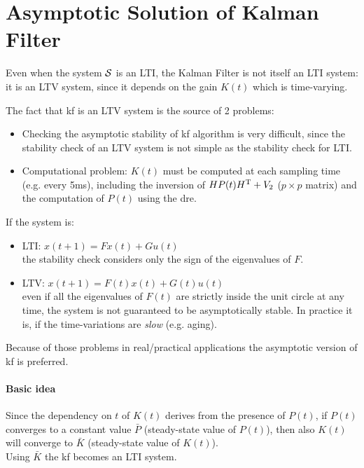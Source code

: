 \section{Asymptotic Solution of Kalman Filter}

\begin{obs} 
    Even when the system $\mathcal{S}$ is an LTI, the Kalman Filter is not itself an LTI system: it is an LTV system, since it depends on the gain $K(t)$ which is time-varying.
\end{obs}


The fact that \gls{kf} is an LTV system is the source of 2 problems:
\begin{itemize}
    \item Checking the asymptotic stability of \gls{kf} algorithm is very difficult, since the stability check of an LTV system is not simple as the stability check for LTI.
    \item Computational problem: $K(t)$ must be computed at each sampling time (e.g. every 5ms), including the inversion of $HP(t)H^{\mathrm{T}}+V_2$ ($p\times p$ matrix) and the computation of $P(t)$ using the \gls{dre}.
\end{itemize}

\begin{recall}

    If the system is: 
    \begin{itemize}
        \item LTI: $x(t+1) = Fx(t) + Gu(t)$ \\ 
        \qquad the stability check considers only the sign of the eigenvalues of $F$.

        \item LTV: $x(t+1) = F(t)x(t) + G(t)u(t)$ \\
        \qquad even if all the eigenvalues of $F(t)$ are strictly inside the unit circle at any time, the system is not guaranteed to be asymptotically stable.
        In practice it is, if the time-variations are \emph{slow} (e.g. aging).
    \end{itemize}

\end{recall}

Because of those problems in real/practical applications the asymptotic version of \gls{kf} is preferred.

\paragraph{Basic idea}
Since the dependency on $t$ of $K(t)$ derives from the presence of $P(t)$, if $P(t)$ converges to a constant value $\bar{P}$ (steady-state value of $P(t)$), then also $K(t)$ will converge to $\bar{K}$ (steady-state value of $K(t)$).
\\
Using $\bar{K}$ the \gls{kf} becomes an LTI system.

